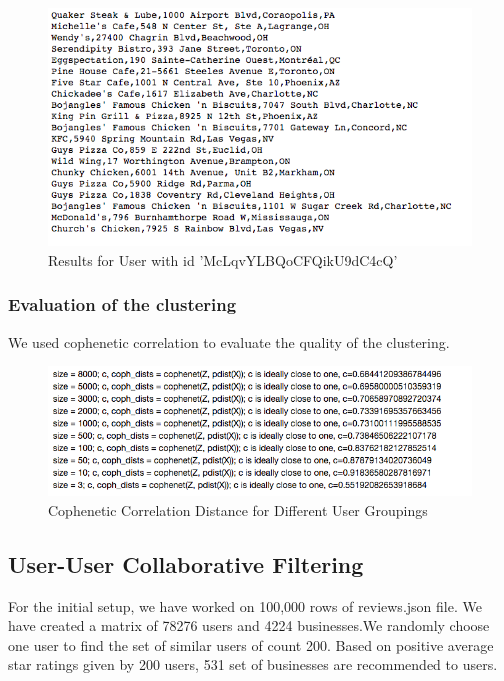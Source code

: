 \documentclass[11pt]{article}
\begin{document}
	\begin{figure}[h]
		\centering
		\includegraphics[scale=0.7]{results_cl.png}
		\caption{Results for User with id 'McLqvYLBQoCFQikU9dC4cQ'}
	\end{figure}
	
	\subsubsection{Evaluation of the clustering}
	We used cophenetic correlation to evaluate the quality of the clustering. 
	\begin{figure}[h]
		\centering
		\includegraphics[scale=0.7]{eval_cl.png}
		\caption{Cophenetic Correlation Distance for Different User Groupings}
	\end{figure}
	\subsection{User-User Collaborative Filtering}

	For the initial setup, we have worked on 100,000 rows of reviews.json file. We have created a matrix of 78276 users and 4224 businesses.We randomly choose one user to find the set of similar users of count 200. Based on positive average star ratings given by 200 users, 531 set of businesses are recommended to users.
	
	
	
\end{document}
